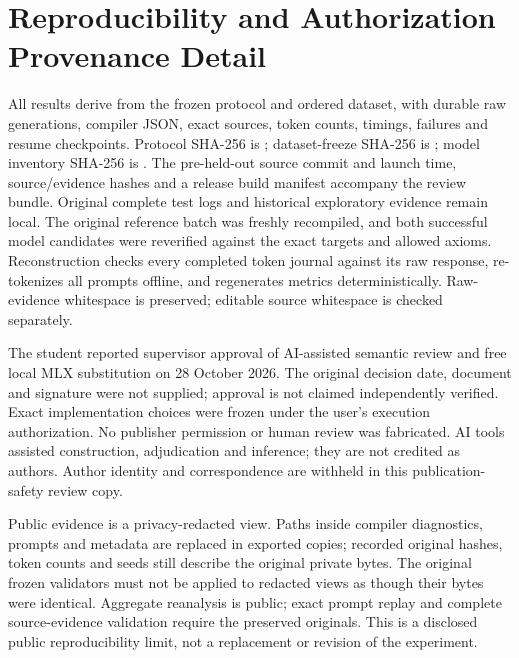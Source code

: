 \documentclass[runningheads,a4paper]{llncs}
\begin{document}
\section{Reproducibility and Authorization Provenance Detail}
\label{app:repro}
All results derive from the frozen protocol and ordered dataset, with durable
raw generations, compiler JSON, exact sources, token counts, timings, failures
and resume checkpoints. Protocol SHA-256 is
; dataset-freeze SHA-256 is
; model inventory SHA-256 is
. The pre-held-out source commit and launch time,
source/evidence hashes and a release build manifest accompany the review bundle.
Original complete test logs and historical exploratory evidence remain local.
The original reference batch was freshly recompiled, and both successful model
candidates were reverified against the exact targets and allowed axioms.
Reconstruction checks every completed token journal against its raw response,
re-tokenizes all prompts offline, and regenerates metrics deterministically.
Raw-evidence whitespace is preserved; editable source whitespace is checked separately.

The student reported supervisor approval of AI-assisted semantic review and
free local MLX substitution on 28 October 2026. The original decision date,
document and signature were not supplied; approval is not claimed independently
verified. Exact implementation choices were frozen under the user's execution
authorization. No publisher permission or human review was fabricated. AI tools
assisted construction, adjudication and inference; they are not credited as
authors. Author identity and correspondence are withheld in this publication-safety review copy.

Public evidence is a privacy-redacted view. Paths inside compiler diagnostics,
prompts and metadata are replaced in exported copies; recorded original hashes,
token counts and seeds still describe the original private bytes. The original
frozen validators must not be applied to redacted views as though their bytes
were identical. Aggregate reanalysis is public; exact prompt replay and complete
source-evidence validation require the preserved originals. This is a disclosed
public reproducibility limit, not a replacement or revision of the experiment.
\end{document}
